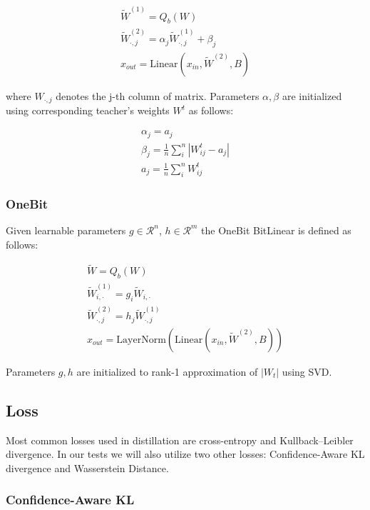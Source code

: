 \documentclass{article}
\begin{document}
\begin{gather*}
    \widetilde{W}^{(1)} = Q_b(W) \\
    \widetilde{W}^{(2)}_{\cdot, j} = \alpha_j\widetilde{W}^{(1)}_{\cdot, j} + \beta_j \\
    x_{out} = \mathrm{Linear}(x_{in}, \widetilde{W}^{(2)}, B)
\end{gather*}

where \(W_{\cdot, j}\) denotes the j-th column of matrix. Parameters \(\alpha, \beta\) are initialized using corresponding teacher's weights \(W^t\) as follows:

\begin{gather*}
    \alpha_j = a_j \\
    \beta_j = \frac{1}{n}\sum^{n}_i\left|W^t_{ij} - a_j\right| \\
    a_j = \frac{1}{n}\sum^n_i W^t_{ij}
\end{gather*}

\subsubsection{OneBit}

Given learnable parameters \(g \in \mathcal{R}^n\), \(h \in \mathcal{R}^m\) the OneBit BitLinear is defined as follows:

\begin{gather*}
    \widetilde{W} = Q_b(W) \\
    \widetilde{W}^{(1)}_{i, \cdot} = g_i\widetilde{W}_{i, \cdot} \\
    \widetilde{W}^{(2)}_{\cdot, j} = h_j\widetilde{W}^{(1)}_{\cdot, j} \\
    x_{out} = \mathrm{LayerNorm}(\mathrm{Linear}(x_{in}, \widetilde{W}^{(2)}, B))
\end{gather*}

Parameters \(g, h\) are initialized to rank-1 approximation of \(|W_t|\) using SVD.

\subsection{Loss}

Most common losses used in distillation are cross-entropy and Kullback–Leibler divergence. In our tests we will also utilize two other losses:  Confidence-Aware KL divergence and Wasserstein Distance.

\subsubsection{Confidence-Aware KL}
\end{document}
